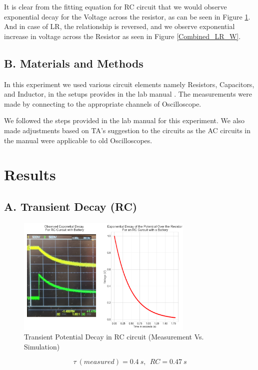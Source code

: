 \documentclass[a4paper,12pt]{article}
\begin{document}
It is clear from the fitting equation for RC circuit that we would observe exponential decay for the Voltage across the resistor, as can be seen in Figure \ref{Combined_RC_B}. And in case of LR, the relationship is reversed, and we observe exponential increase 
in voltage across the Resistor as seen in Figure \ref{Combined_LR_W}.

\subsection*{B. Materials and Methods}

In this experiment we used various circuit elements namely Resistors, Capacitors, and Inductor, in the setups provides 
in the lab manual \cite{lab-manual-ex7}. The measurements were made by connecting to the appropriate channels of Oscilloscope.

We followed the steps provided in the lab manual \cite{lab-manual-ex7} for this 
experiment. We also made adjustments based on TA's suggestion to the circuits as the 
AC circuits in the manual were applicable to old Oscilloscopes.

\section{Results}
\subsection*{A. Transient Decay (RC)}

\begin{figure}[H]
  \centerline{\includegraphics[width=0.75\textwidth]{../Simulated Curves/RC_B-mod.png}}
  \caption{Transient Potential Decay in RC circuit (Measurement Vs. Simulation)}
  \label{Combined_RC_B}
\end{figure}
$$\tau\ (measured) = 0.4\ s, \ \ RC = 0.47\ s$$
\end{document}

